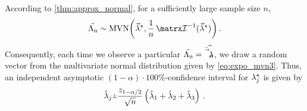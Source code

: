 \documentclass[../main.tex]{subfiles}
\begin{document}
According to \cref{thm:approx_normal}, for a sufficiently large sample size $n$,
\begin{equation}
\label{eq:expo_mvn3}
    \sampdexpo \sim \mathrm{MVN}\biggl(\tparam{\vec\lambda}, \frac{1}{n}\infomatrx^{-1}(\tparam{\vec\lambda})\biggr)\,.
\end{equation}
Consequently, each time we observe a particular $\mathrm{\vec{\Lambda_n}} = \vec{\hat{\vec\lambda}_n}$, we draw a random vector from the multivariate normal distribution given by \cref{eq:expo_mvn3}. Thus, an independent asymptotic $(1-\alpha) \cdot 100 \%$-confidence interval for ${\lambda}^{\star}_j$ is given by
\begin{equation}
    \estimator{\lambda}_j \raisebox{.2ex}{$\scriptstyle\pm$} \frac{z_{1 - \alpha/2}}{\sqrt n}
    \left (
        \estimator{\lambda}_1 + \estimator{\lambda}_2 + \estimator{\lambda}_3
    \right)\,.
\end{equation}
\end{document}
